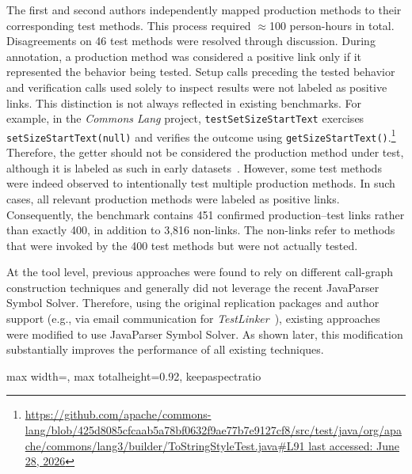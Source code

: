 The first and second authors independently mapped production methods to their corresponding test methods. This process required $\approx$100 person-hours in total.  Disagreements on 46 test methods were resolved through discussion. During annotation, a production method was considered a positive link only if it represented the behavior being tested. Setup calls preceding the tested behavior and verification calls used solely to inspect results were not labeled as positive links. This distinction is not always reflected in existing benchmarks. For example, in the \emph{Commons Lang} project, \texttt{testSetSizeStartText} exercises \texttt{setSizeStartText(null)} and verifies the outcome using \texttt{getSizeStartText()}.\footnote{\href{https://github.com/apache/commons-lang/blob/425d8085cfcaab5a78bf0632f9ae77b7e9127cf8/src/test/java/org/apache/commons/lang3/builder/ToStringStyleTest.java\#L91}{https://github.com/apache/commons-lang/blob/425d8085cfcaab5a78bf0632f9ae77b7e9127cf8/src/test\allowbreak/java/org/apache/commons/lang3/builder/ToStringStyleTest.java\#L91 last accessed: June 28, 2026}} Therefore, the getter should not be considered the production method under test, although it is labeled as such in early datasets~\cite{white_tctracer_2022}. However, some test methods were indeed observed to intentionally test multiple production methods. In such cases, all relevant production methods were labeled as positive links. Consequently, the benchmark contains 451 confirmed production--test links rather than exactly 400, in addition to 3,816 non-links. The non-links refer to methods that were invoked by the 400 test methods but were not actually tested.

At the tool level, previous approaches were found to rely on different call-graph construction techniques and generally did not leverage the recent JavaParser Symbol Solver. Therefore, using the original replication packages and author support (e.g., via email communication for \emph{TestLinker}~\cite{sun_method-level_2024}), existing approaches~\cite{white_establishing_2020,sun_method-level_2024} were modified to use JavaParser Symbol Solver. As shown later, this modification substantially improves the performance of all existing techniques.

\begin{table}[htbp]
\centering
\caption{Production-to-test link prediction performance by dataset for all approaches.}
\label{tab:t2p-link-metric}
\small
\setlength{\tabcolsep}{4pt}
\renewcommand{\arraystretch}{0.95}

\begin{adjustbox}{max width=\textwidth, max totalheight=0.92\textheight, keepaspectratio}

\end{adjustbox}
\end{table}

